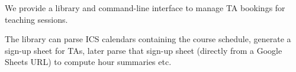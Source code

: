 We provide a library and command-line interface to manage TA bookings for 
teaching sessions.

The library can parse ICS calendars containing the course schedule, generate a 
sign-up sheet for TAs, later parse that sign-up sheet (directly from a Google 
Sheets URL) to compute hour summaries etc.

